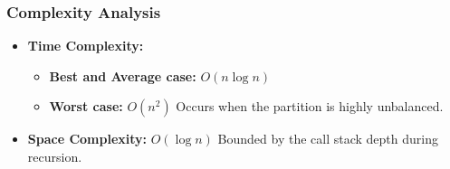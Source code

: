     \subsubsection{Complexity Analysis}
        \begin{itemize}
            \item \textbf{Time Complexity:}
            \begin{itemize}
                \item \textbf{Best and Average case:} $O(n \log n)$
                \item \textbf{Worst case:} $O(n^2)$ 
                    \subitem Occurs when the partition is highly unbalanced.
            \end{itemize}
            \item \textbf{Space Complexity:} $O(\log n)$ 
                \subitem Bounded by the call stack depth during recursion.
        \end{itemize}
        
